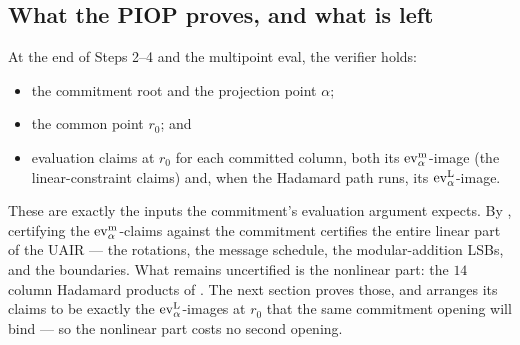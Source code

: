 \subsection{What the PIOP proves, and what is left}
\label{sec:piop-handoff}

At the end of Steps 2--4 and the multipoint eval, the verifier holds:
\begin{itemize}[leftmargin=2em]
  \item the commitment root and the projection point $\alpha$;
  \item the common point $r_0$; and
  \item evaluation claims at $r_0$ for each committed column, both its
    $\operatorname{ev}^{\mathrm{m}}_{\alpha}$-image (the linear-constraint claims) and, when the Hadamard
    path runs, its $\operatorname{ev}^{\mathrm{L}}_{\alpha}$-image.
\end{itemize}
These are exactly the inputs the commitment's evaluation argument expects.
By , certifying the $\operatorname{ev}^{\mathrm{m}}_{\alpha}$-claims against the
commitment certifies the entire linear part of the UAIR --- the rotations,
the message schedule, the modular-addition LSBs, and the boundaries. What
remains uncertified is the nonlinear part: the $14$ column Hadamard
products of . The next section proves those, and arranges its
claims to be exactly the $\operatorname{ev}^{\mathrm{L}}_{\alpha}$-images at $r_0$ that the same commitment
opening will bind --- so the nonlinear part costs no second opening.
